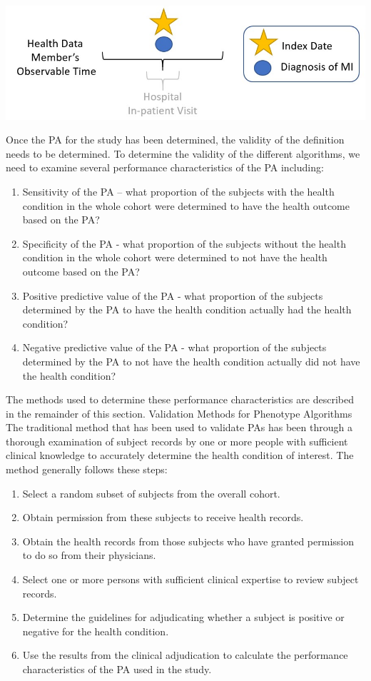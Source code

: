 \documentclass[11pt]{book}
\theoremstyle{definition}
\theoremstyle{definition}
\theoremstyle{definition}
\theoremstyle{remark}
\begin{document}
\begin{center}\includegraphics[width=0.75\linewidth]{images/ClinicalValidity/figure4} \end{center}

Once the PA for the study has been determined, the validity of the definition needs to be determined. To determine the validity of the different algorithms, we need to examine several performance characteristics of the PA including:

\begin{enumerate}
\def\labelenumi{\arabic{enumi})}
\item
  Sensitivity of the PA -- what proportion of the subjects with the health condition in the whole cohort were determined to have the health outcome based on the PA?
\item
  Specificity of the PA - what proportion of the subjects without the health condition in the whole cohort were determined to not have the health outcome based on the PA?
\item
  Positive predictive value of the PA - what proportion of the subjects determined by the PA to have the health condition actually had the health condition?
\item
  Negative predictive value of the PA - what proportion of the subjects determined by the PA to not have the health condition actually did not have the health condition?
\end{enumerate}

The methods used to determine these performance characteristics are described in the remainder of this section.
Validation Methods for Phenotype Algorithms
The traditional method that has been used to validate PAs has been through a thorough examination of subject records by one or more people with sufficient clinical knowledge to accurately determine the health condition of interest. The method generally follows these steps:

\begin{enumerate}
\def\labelenumi{\arabic{enumi})}
\item
  Select a random subset of subjects from the overall cohort.
\item
  Obtain permission from these subjects to receive health records.
\item
  Obtain the health records from those subjects who have granted permission to do so from their physicians.
\item
  Select one or more persons with sufficient clinical expertise to review subject records.
\item
  Determine the guidelines for adjudicating whether a subject is positive or negative for the health condition.
\item
  Use the results from the clinical adjudication to calculate the performance characteristics of the PA used in the study.
\end{enumerate}
\end{document}

